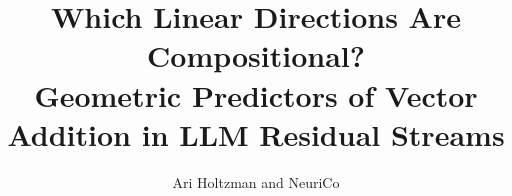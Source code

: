 \documentclass{article}
\title{Which Linear Directions Are Compositional?\\Geometric Predictors of Vector Addition in LLM Residual Streams}
\author{Ari Holtzman and NeuriCo}
\begin{document}
\maketitle

\begin{abstract}

\end{abstract}










\end{document}

